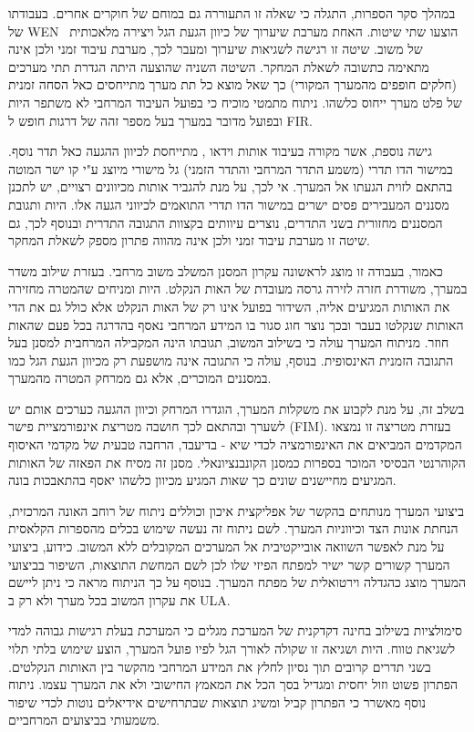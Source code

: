 \par
במהלך סקר הספרות, התגלה כי שאלה זו התעוררה גם במוחם של חוקרים אחרים.
בעבודתו של 
\textenglish{WEN}~\cite{wen2013extending}
הוצעו שתי שיטות.
האחת מערבת שיערוך של כיוון הגעת הגל ויצירה מלאכותית של משוב.
שיטה זו רגישה לשגיאות שיערוך ומעבר לכך, מערבת עיבוד זמני ולכן אינה מתאימה כתשובה לשאלת המחקר.
השיטה השניה שהוצעה היתה הגדרת תתי מערכים (חלקים חופפים מהמערך המקורי) כך שאל מוצא כל תת מערך מתייחסים כאל הסחה זמנית של פלט מערך ייחוס כלשהו.
ניתוח מתמטי מוכיח כי בפועל העיבוד המרחבי לא משתפר היות ובפועל מדובר במערך בעל מספר זהה של  דרגות חופש ל
\textenglish{FIR}.
\par
גישה נוספת, אשר מקורה בעיבוד אותות וידאו 
\cite{bruton1985three}
, מתייחסת לכיוון ההגעה כאל תדר נוסף.
במישור הדו תדרי (משמע התדר המרחבי והתדר הזמני) גל מישורי מיוצג ע"י קו ישר המוטה בהתאם לזוית הגעתו אל המערך.
אי לכך, על מנת להגביר אותות מכיוונים רצויים, יש לתכנן מסננים המעבירים פסים ישרים במישור הדו תדרי התואמים לכיווני הגעה אלו.
היות ותגובת המסננים מחזורית בשני התדרים, נוצרים עיוותים בקצוות התגובה התדרית ובנוסף לכך, גם שיטה זו מערבת עיבוד זמני ולכן אינה מהווה פתרון מספק לשאלת המחקר.
\par
כאמור, בעבודה זו מוצג לראשונה עקרון המסנן המשלב משוב מרחבי.
בעזרת שילוב משדר במערך, משודרת חזרה לזירה גרסה מעובדת של האות הנקלט.
היות ומניחים שהמטרה מחזירה את האותות המגיעים אליה, השידור בפועל אינו רק של האות הנקלט אלא כולל גם את  הדי האותות שנקלטו בעבר ובכך נוצר חוג סגור בו המידע המרחבי נאסף בהדרגה בכל פעם שהאות חוזר.
מניתוח המערך עולה כי בשילוב המשוב, תגובתו הינה המקבילה המרחבית למסנן בעל התגובה הזמנית האינסופית.
בנוסף, עולה כי התגובה אינה מושפעת רק מכיוון הגעת הגל כמו במסננים המוכרים, אלא גם ממרחק המטרה מהמערך. 
\par
בשלב זה, על מנת לקבוע את משקלות המערך, הוגדרו המרחק וכיוון ההגעה כערכים אותם יש לשערך ובהתאם לכך חושבה מטריצת אינפורמציית פישר
\textenglish{(FIM)}.
בעזרת מטריצה זו נמצאו המקדמים המביאים את האינפורמציה לכדי שיא - בדיעבד, הרחבה טבעית של מקדמי האיסוף הקוהרנטי הבסיסי המוכר בספרות כמסנן הקונבנציונאלי.
מסנן זה מסיח את הפאזה של האותות המגיעים מחיישנים שונים כך שאות המגיע מכיוון כלשהו יאסף בהתאבכות בונה.
\par
ביצועי המערך מנותחים בהקשר של אפליקצית איכון וכוללים ניתוח של רוחב האונה המרכזית, הנחתת אונות הצד וכיווניות המערך.
לשם ניתוח זה נעשה שימוש בכלים מהספרות הקלאסית על מנת לאפשר השוואה אובייקטיבית אל המערכים המקובלים ללא המשוב.
כידוע, ביצועי המערך קשורים קשר ישיר למפתח הפיזי שלו לכן לשם המחשת התוצאות, השיפור בביצועי המערך מוצג כהגדלה וירטואלית של מפתח המערך.
בנוסף על כך הניתוח מראה כי ניתן ליישם את עקרון המשוב בכל מערך ולא רק ב 
\textenglish{ULA}.
\par
סימולציות בשילוב בחינה דקדקנית של המערכת מגלים כי המערכת בעלת רגישות גבוהה למדי לשגיאת טווח.
היות ושגיאה זו שקולה לאורך הגל לפיו פועל המערך, הוצע שימוש בלתי תלוי בשני תדרים קרובים תוך נסיון לחלץ את המידע המרחבי מהקשר בין האותות הנקלטים.
הפתרון פשוט וזול יחסית ומגדיל בסך הכל את המאמץ החישובי ולא את המערך עצמו.
ניתוח נוסף מאשרר כי הפתרון קביל ומשיג תוצאות שבתרחישים אידיאלים נוטות לכדי שיפור משמעותי בביצועים המרחביים.
